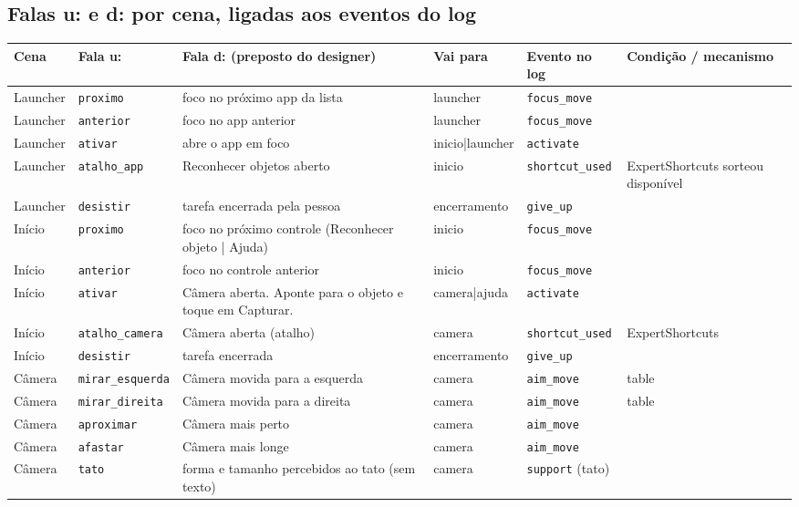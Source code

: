 \documentclass[a4paper,10pt]{article}
\begin{document}
\subsection*{Falas u: e d: por cena, ligadas aos eventos do log}
\begin{longtable}{l l L{7.5cm} L{2.6cm} L{3.4cm} L{5.2cm}}
\toprule
Cena & Fala u: & Fala d: (preposto do designer) & Vai para & Evento no log & Condição / mecanismo\\
\midrule\endhead
Launcher & \texttt{proximo} & foco no próximo app da lista & launcher & \texttt{focus\_move} & \\
Launcher & \texttt{anterior} & foco no app anterior & launcher & \texttt{focus\_move} & \\
Launcher & \texttt{ativar} & abre o app em foco & inicio|launcher & \texttt{activate} & \\
Launcher & \texttt{atalho\_app} & Reconhecer objetos aberto & inicio & \texttt{shortcut\_used} & ExpertShortcuts sorteou disponível\\
Launcher & \texttt{desistir} & tarefa encerrada pela pessoa & encerramento & \texttt{give\_up} & \\
Início & \texttt{proximo} & foco no próximo controle (Reconhecer objeto | Ajuda) & inicio & \texttt{focus\_move} & \\
Início & \texttt{anterior} & foco no controle anterior & inicio & \texttt{focus\_move} & \\
Início & \texttt{ativar} & Câmera aberta. Aponte para o objeto e toque em Capturar. & camera|ajuda & \texttt{activate} & \\
Início & \texttt{atalho\_camera} & Câmera aberta (atalho) & camera & \texttt{shortcut\_used} & ExpertShortcuts\\
Início & \texttt{desistir} & tarefa encerrada & encerramento & \texttt{give\_up} & \\
Câmera & \texttt{mirar\_esquerda} & Câmera movida para a esquerda & camera & \texttt{aim\_move} & table\\
Câmera & \texttt{mirar\_direita} & Câmera movida para a direita & camera & \texttt{aim\_move} & table\\
Câmera & \texttt{aproximar} & Câmera mais perto & camera & \texttt{aim\_move} & \\
Câmera & \texttt{afastar} & Câmera mais longe & camera & \texttt{aim\_move} & \\
Câmera & \texttt{tato} & forma e tamanho percebidos ao tato (sem texto) & camera & \texttt{support} (tato) & \\

\end{longtable}
\end{document}
